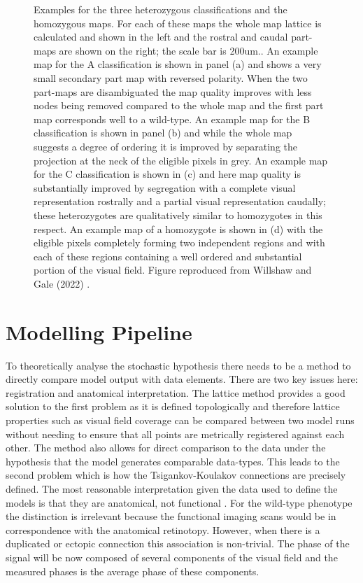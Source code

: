 \begin{figure}[h!]
\def\c{Examples for the three heterozygous classifications and the homozygous maps. }
\caption[\c]{ \c For each of these maps the whole map lattice is calculated and shown in the left and the rostral and caudal part-maps are shown on the right; the scale bar is 200um.. An example map for the A classification is shown in panel (a) and shows a very small secondary part map with reversed polarity. When the two part-maps are disambiguated the map quality improves with less nodes being removed compared to the whole map and the first part map corresponds well to a wild-type. An example map for the B classification is shown in panel (b) and while the whole map suggests a degree of ordering it is improved by separating the projection at the neck of the eligible pixels in grey. An example map for the C classification is shown in (c) and here map quality is substantially improved by segregation with a complete visual representation rostrally and a partial visual representation caudally; these heterozygotes are qualitatively similar to homozygotes in this respect. An example map of a homozygote is shown in (d) with the eligible pixels completely forming two independent regions and with each of these regions containing a well ordered and substantial portion of the visual field. Figure reproduced from Willshaw and Gale (2022) \cite{Willshaw2022-fs}. \label{fig:examples}}
\end{figure}
\section{Modelling Pipeline}
To theoretically analyse the stochastic hypothesis there needs to be a method to directly compare model output with data elements. There are two key issues here: registration and anatomical interpretation. The lattice method provides a good solution to the first problem as it is defined topologically and therefore lattice properties such as visual field coverage can be compared between two model runs without needing to ensure that all points are metrically registered against each other. The method also allows for direct comparison to the data under the hypothesis that the model generates comparable data-types. This leads to the second problem which is how the Tsigankov-Koulakov connections are precisely defined. The most reasonable interpretation given the data used to define the models is that they are anatomical, not functional \cite{Tsigankov2006-uy, Koulakov2004-ia, Tsigankov2010-on, Triplett2011-jk}. For the wild-type phenotype the distinction is irrelevant because the functional imaging scans would be in correspondence with the anatomical retinotopy. However, when there is a duplicated or ectopic connection this association is non-trivial. The phase of the signal will be now composed of several components of the visual field and the measured phases is the average phase of these components.

